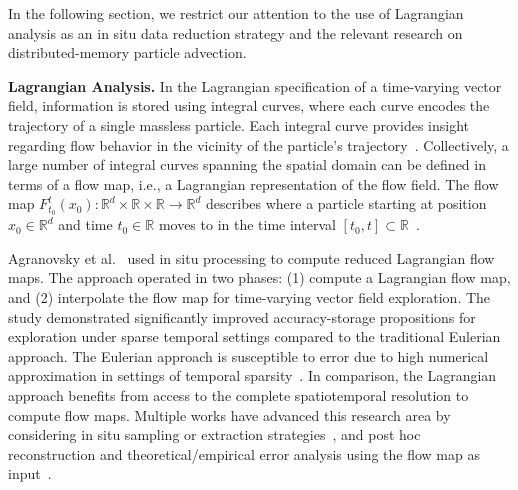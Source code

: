 In the following section, we restrict our attention to the use of Lagrangian analysis as an in situ data reduction strategy and the relevant research on distributed-memory particle advection.

\textbf{Lagrangian Analysis.}
%
In the Lagrangian specification of a time-varying vector field, information is stored using integral curves, where each curve encodes the trajectory of a single massless particle.
%
Each integral curve provides insight regarding flow behavior in the vicinity of the particle's trajectory~\cite{bujack2015lagrangian}.
%
Collectively, a large number of integral curves spanning the spatial domain can be defined in terms of a flow map, i.e., a Lagrangian representation of the flow field.
%
The flow map $F_{t_0}^{t}(x_0):\mathbb R^d \times \mathbb R \times \mathbb R  \to \mathbb R^d$ describes where a particle starting at position $x_0\in \mathbb R^d$ and time $t_0\in \mathbb R$ moves to in the time interval $[t_0,t]\subset \mathbb R$~\cite{garth2007efficient}.
%

Agranovsky et al.~\cite{agranovsky2014improved} used in situ processing to compute reduced Lagrangian flow maps. 
%
The approach operated in two phases: (1) compute a Lagrangian flow map, and (2) interpolate the flow map for time-varying vector field exploration.
%
The study demonstrated significantly improved accuracy-storage propositions for exploration under sparse temporal settings compared to the traditional Eulerian approach.
%
The Eulerian approach is susceptible to error due to high numerical approximation in settings of temporal sparsity~\cite{costa2004lagrangian,Qin2014,agranovsky2014improved,sane2018revisiting}. 
%
In comparison, the Lagrangian approach benefits from access to the complete spatiotemporal resolution to compute flow maps.
%
Multiple works have advanced this research area by considering in situ sampling or extraction strategies~\cite{sane2019interpolation, rapp2019void}, and post hoc reconstruction and theoretical/empirical error analysis using the flow map as input~\cite{hlawatsch2011hierarchical, bujack2015lagrangian, chandler2015interpolation, chandler2016analysis, hummel2016error, sane2018revisiting, sane2019interpolation, rapp2019void, jakob2020fluid}.

